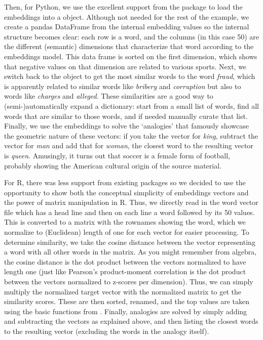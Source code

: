 Then, for Python, we use the excellent support from the  package to load the embeddings into a  object.
Although not needed for the rest of the example, we create a pandas DataFrame from the internal embedding values so the internal structure becomes clear: each row is a word, and the columns (in this case 50) are the different (semantic) dimensions that characterize that word according to the embeddings model.
This data frame is sorted on the first dimension, which shows that negative values on that dimension are related to various sports.
Next, we switch back to the  object to get the most similar words to the word \emph{fraud}, which is apparently related to similar words like \emph{bribery} and \emph{corruption} but also to words like \emph{charges} and \emph{alleged}.
These similarities are a good way to (semi-)automatically expand a dictionary: start from a small list of words,
find all words that are similar to those words, and if needed manually curate that list.
Finally, we use the embeddings to solve the `analogies' that famously showcase the geometric nature of these vectors:
if you take the vector for \emph{king}, subtract the vector for \emph{man} and add that for \emph{woman},
the closest word to the resulting vector is \emph{queen}.
Amusingly, it turns out that soccer is a female form of football, probably showing the American cultural origin of the source material.

For R, there was less support from existing packages so we decided to use the opportunity to show both the conceptual simplicity of embeddings vectors and the power of matrix manipulation in R.
Thus, we directly read in the word vector file which has a head line and then on each line a word followed by its 50 values.
This is converted to a matrix with the rownames showing the word,
which we normalize to (Euclidean) length of one for each vector for easier processing. 
To determine similarity, we take the cosine distance between the vector representing a word with all other words in the matrix.
As you might remember from algebra, the cosine distance is the dot product between the vectors normalized to have length one
(just like Pearson's product-moment correlation is the dot product between the vectors normalized to z-scores per dimension).
Thus, we can simply multiply the normalized target vector with the normalized matrix to get the similarity scores.
These are then sorted, renamed, and the top values are taken using the basic functions from .
Finally, analogies are solved by simply adding and subtracting the vectors as explained above, and then listing the closest words to the resulting vector
(excluding the words in the analogy itself). 

